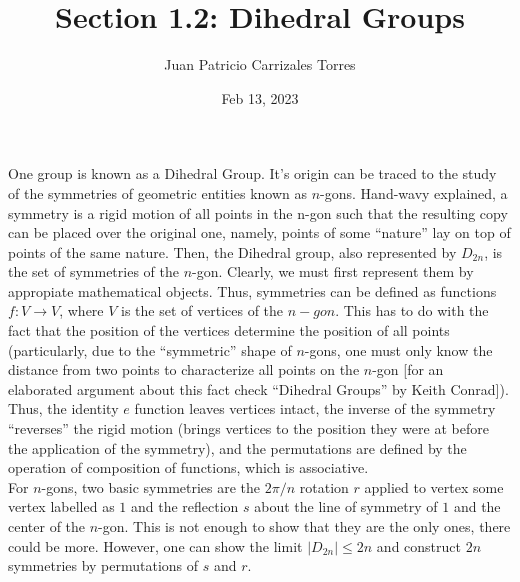 \documentclass[12pt]{article}
\begin{document}
  
\title{Section 1.2: Dihedral Groups}
   \author{Juan Patricio Carrizales Torres}
     \date{Feb 13, 2023}
       \maketitle

       One group is known as a Dihedral Group. It's origin can be traced to the study of the symmetries of geometric entities known as $n$-gons. Hand-wavy explained, a symmetry is a rigid motion of all points in the n-gon such that the resulting copy can be placed over the original one, namely, points of some ``nature'' lay on top of points of the same nature. Then, the Dihedral group, also represented by $D_{2n}$, is the set of symmetries of the $n$-gon. Clearly, we must first represent them by appropiate mathematical objects. Thus, symmetries can be defined as functions $f:V\to V$, where $V$ is the set of vertices of the $n-gon$. This has to do with the fact that the position of the vertices determine the position of all points (particularly, due to the ``symmetric'' shape of $n$-gons, one must only know the distance from two points to characterize all points on the $n$-gon [for an elaborated argument about this fact check ``Dihedral Groups'' by Keith Conrad]). Thus, the identity $e$ function leaves vertices intact, the inverse of the symmetry ``reverses'' the rigid motion (brings vertices to the position they were at before the application of the symmetry), and the permutations are defined by the operation of composition of functions, which is associative. \\

      For $n$-gons, two basic symmetries are the $2\pi/n$ rotation $r$ applied to vertex some vertex labelled as $1$ and the reflection $s$ about the line of symmetry of $1$ and the center of the $n$-gon. This is not enough to show that they are the only ones, there could be more. However, one can show the limit $|D_{2n}|\leq 2n$ and construct $2n$ symmetries by permutations of $s$ and $r$. 
\end{document}
